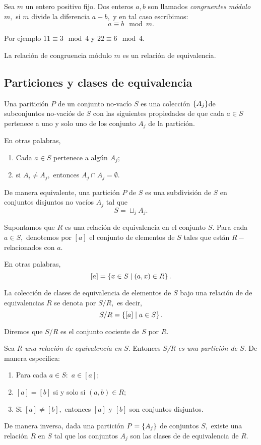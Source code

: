 	\label{lip:exmp:2.12.c}
	Sea $m$ un entero positivo fijo. Dos enteros $a,b$ son llamados \emph{congruentes módulo $m,$} si $m$ divide la diferencia $a-b,$ y en tal caso escribimos:
	$$
	a\equiv b \mod m.
	$$
	
	
	Por ejemplo $11\equiv 3 \mod 4$ y $22\equiv 6 \mod 4.$
	
	
	La relación de congruencia módulo $m$ es un relación de equivalencia. 



\subsection{Particiones y clases de equivalencia}


	Una paritición $P$ de un conjunto no-vacío $S$ es una colección $\left\{ A_{j} \right\}$de subconjuntos no-vaciós de $S$ con las siguientes propiedades de que cada $a\in S$ pertenece a uno y solo uno de los conjunto $A_{j}$ de la partición.  
	
	En otras palabras,
	\begin{enumerate}
		\item Cada $a\in S$ pertenece a algún $A_{j};$
		\item si $A_{i}\neq A_{j},$ entonces $A_{j}\cap A_{j}=\emptyset.$
		
	\end{enumerate}
	
	
	De manera equivalente, una partición $P$ de $S$ es una subdivisión de $S$ en conjuntos disjuntos no vacíos $A_{j}$ tal que $$S= \sqcup_{j} A_{j}.$$



	Supontamos que $R$ es una relación de equivalencia en el conjunto $S.$ Para cada $a\in S,$ denotemos por $[a]$ el conjunto de elementos de $S$ tales que están $R-$relacionados con $a.$ 
	
	
	En otras palabras,
	$$
	[a]=\left\{ x \in S \mid (a,x)\in R \right\}.
	$$



	La colección de clases de equivalencia de elementos de $S$ bajo una relación de de equivalencias $R$ se denota por $S/R,$ es decir,
	$$
	S/R=\left\{ [a] \mid a \in S \right\}.
	$$
	 
	
	Diremos que $S/R$ es el conjunto cociente de $S$ por $R.$



	\begin{teorema}
		\label{lip:thm:2.6}
		Sea \emph{$R$ una relación de equivalencia en $S.$} Entonces \emph{S/R es una partición de $S.$} 
		De manera especifica:
		\begin{enumerate}
			\item Para cada $a \in S:$  $a\in [a];$
			\item $[a]=[b]$ si y solo si $(a,b)\in R;$
			\item Si $[a]\neq [b],$ entonces $[a]$ y $[b]$ son conjuntos disjuntos. 
		\end{enumerate}
		
		
		De manera inversa, dada una partición $P=\left\{ A_{j} \right\}$ de conjuntos $S,$ existe una relación $R$ en $S$ tal que los conjuntos $A_{j}$ son las clases de de equivalencia de $R.$
	\end{teorema}
	



